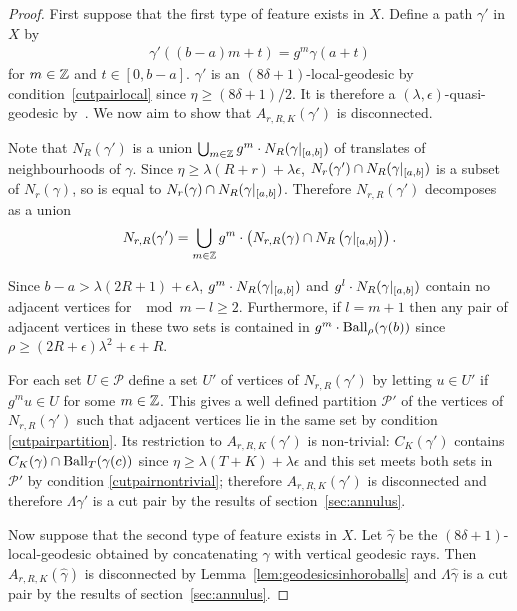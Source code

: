 \begin{proof} First suppose that the first type of feature exists in $X$.
Define a path $\gamma'$ in $X$ by
\begin{align*} \gamma'\left((b - a)m + t\right) = g^m\gamma(a + t)
\end{align*}
for $m \in \mathbb{Z}$ and $t \in [0, b-a]$. $\gamma'$ is an $(8\delta +
1)$-local-geodesic by condition~\ref{cutpairlocal} since $\eta \geq (8\delta +
1)/2$.  It is therefore a $(\lambda, \epsilon)$-quasi-geodesic
by~\cite{bridsonhaefliger99}. We now aim to show that $A_{r, R, K}(\gamma')$ is
disconnected.

Note that $N_R(\gamma')$ is a union $\bigcup_{m\in\mathbb{Z}} g^m\cdot
N_R(\gamma\vert_{[a, b]})$ of translates of neighbourhoods of $\gamma$.
Since $\eta \geq \lambda(R + r) + \lambda\epsilon$, $N_r(\gamma') \cap
N_R(\gamma\vert_{[a, b]})$ is a subset of $N_{r}(\gamma)$, so is equal to
$N_r(\gamma) \cap N_R(\gamma\vert_{[a, b]})$.  Therefore $N_{r,
R}(\gamma')$ decomposes as a union
\begin{align*} N_{r, R}(\gamma') = \bigcup_{m \in \mathbb{Z}} g^m\cdot
  \left(N_{r, R}(\gamma) \cap N_R\left(\gamma\vert_{ 
    [a,b]}\right)\right).
\end{align*}

Since $b - a > \lambda(2R+1) + \epsilon\lambda$, $g^m \cdot
N_R(\gamma\vert_{[a, b]})$ and $g^l \cdot N_R(\gamma\vert_{[a, b]})$
contain no adjacent vertices for $\mod{m - l} \geq 2$. Furthermore, if $l =
m+1$ then any pair of adjacent vertices in these two sets is contained in
$g^m\cdot \operatorname{\mathrm{Ball}}_\rho(\gamma(b))$ since $\rho \geq (2R + \epsilon)\lambda^2 +
\epsilon + R$.

For each set $U \in \mathcal{P}$ define a set $U'$ of vertices of $N_{r,
R}(\gamma')$ by letting $u \in U'$ if $g^m u \in U$ for some $m \in \mathbb{Z}$.
This gives a well defined partition $\mathcal{P}'$ of the vertices of $N_{r,
R}(\gamma')$ such that adjacent vertices lie in the same set by condition
\ref{cutpairpartition}. Its restriction to $A_{r, R, K}(\gamma')$ is
non-trivial: $C_K(\gamma')$ contains $C_K(\gamma) \cap \operatorname{\mathrm{Ball}}_T(\gamma(c))$
since $\eta \geq \lambda(T + K) + \lambda\epsilon$ and this set meets both sets
in $\mathcal{P}'$ by condition \ref{cutpairnontrivial}; therefore $A_{r, R,
K}(\gamma')$ is disconnected and therefore $\Lambda\gamma'$ is a cut pair by
the results of section~\ref{sec:annulus}.

Now suppose that the second type of feature exists in $X$. Let $\hat\gamma$ be
the $(8\delta + 1)$-local-geodesic obtained by concatenating $\gamma$ with
vertical geodesic rays. Then $A_{r, R, K}(\hat\gamma)$ is disconnected by
Lemma~\ref{lem:geodesicsinhoroballs} and $\Lambda\hat\gamma$ is a cut pair by
the results of section~\ref{sec:annulus}.


\end{proof}
